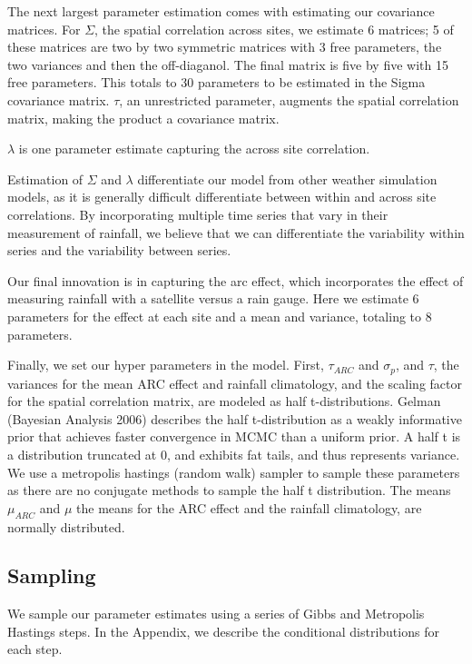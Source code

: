\documentclass[12pt]{article}
\begin{document}
The next largest parameter estimation comes with estimating our covariance matrices. For $\Sigma$, the spatial correlation across sites, we estimate 6 matrices;  5 of these matrices are two by two symmetric matrices with 3 free parameters, the two variances and then the off-diaganol. The final matrix is five by five with 15 free parameters. This totals to 30 parameters to be estimated in the Sigma covariance matrix. $\tau$, an unrestricted parameter, augments the spatial correlation matrix, making the product a covariance matrix. 

$\lambda$ is one parameter estimate capturing the across site correlation. 

Estimation of $\Sigma$ and $\lambda$ differentiate our model from other weather simulation models, as it is generally difficult differentiate between within and across site correlations. By incorporating multiple time series that vary in their measurement of rainfall, we believe that we can differentiate the variability within series and the variability between series. 

Our final innovation is in capturing the arc effect, which incorporates the effect of measuring rainfall with a satellite versus a rain gauge. Here we estimate 6 parameters for the effect at each site and a mean and variance, totaling to 8 parameters. 

Finally, we set our hyper parameters in the model. First, $\tau_{ARC}$ and $\sigma_p$, and $\tau$, the variances for the mean ARC effect and rainfall climatology, and the scaling factor for the spatial correlation matrix, are modeled as half t-distributions. Gelman (Bayesian Analysis 2006) describes the half t-distribution as a weakly informative prior that achieves faster convergence in MCMC than a uniform prior. A half t is a distribution truncated at 0, and exhibits fat tails, and thus represents variance. We use a metropolis hastings (random walk) sampler to sample these parameters as there are no conjugate methods to sample the half t distribution. The means $\mu_{ARC}$ and $\mu$ the means for the ARC effect and the rainfall climatology, are normally distributed. 

\subsection{Sampling}
We sample our parameter estimates using a series of Gibbs and Metropolis Hastings steps. In the Appendix, we describe the conditional distributions for each step.
\end{document}
